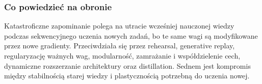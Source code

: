 \subsubsection{Co powiedzieć na obronie}

Katastroficzne zapominanie polega na utracie wcześniej nauczonej wiedzy podczas sekwencyjnego uczenia nowych zadań, bo te same wagi są modyfikowane przez nowe gradienty. Przeciwdziała się przez rehearsal, generative replay, regularyzację ważnych wag, modularność, zamrażanie i współdzielenie cech, dynamiczne rozszerzanie architektury oraz distillation. Sednem jest kompromis między stabilnością starej wiedzy i plastycznością potrzebną do uczenia nowej.
